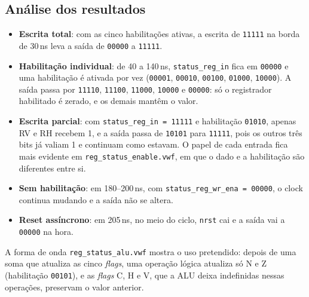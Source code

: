 

\subsection{Análise dos resultados}

\begin{itemize}
  \item \textbf{Escrita total}: com as cinco habilitações ativas, a escrita de \texttt{11111} na borda de 30\,ns leva a saída de \texttt{00000} a \texttt{11111}.
  \item \textbf{Habilitação individual}: de 40 a 140\,ns, \texttt{status\_reg\_in} fica em \texttt{00000} e uma habilitação é ativada por vez (\texttt{00001}, \texttt{00010}, \texttt{00100}, \texttt{01000}, \texttt{10000}). A saída passa por \texttt{11110}, \texttt{11100}, \texttt{11000}, \texttt{10000} e \texttt{00000}: só o registrador habilitado é zerado, e os demais mantêm o valor.
  \item \textbf{Escrita parcial}: com \texttt{status\_reg\_in = 11111} e habilitação \texttt{01010}, apenas RV e RH recebem 1, e a saída passa de \texttt{10101} para \texttt{11111}, pois os outros três bits já valiam 1 e continuam como estavam. O papel de cada entrada fica mais evidente em \texttt{reg\_status\_enable.vwf}, em que o dado e a habilitação são diferentes entre si.
  \item \textbf{Sem habilitação}: em 180--200\,ns, com \texttt{status\_reg\_wr\_ena = 00000}, o clock continua mudando e a saída não se altera.
  \item \textbf{Reset assíncrono}: em 205\,ns, no meio do ciclo, \texttt{nrst} cai e a saída vai a \texttt{00000} na hora.
\end{itemize}

A forma de onda \texttt{reg\_status\_alu.vwf} mostra o uso pretendido: depois de uma soma que atualiza as cinco \textit{flags}, uma operação lógica atualiza só N e Z (habilitação \texttt{00101}), e as \textit{flags} C, H e V, que a ALU deixa indefinidas nessas operações, preservam o valor anterior.
